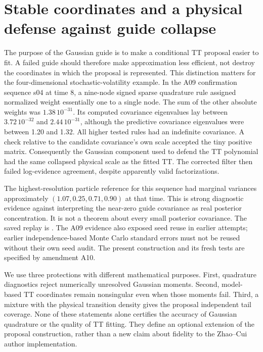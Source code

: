 \section{Stable coordinates and a physical defense against guide collapse}
\label{sec:robust-guide}

The purpose of the Gaussian guide is to make a conditional TT proposal easier
to fit. A failed guide should therefore make approximation less efficient,
not destroy the coordinates in which the proposal is represented. This
distinction matters for the four-dimensional stochastic-volatility example.
In the A09 confirmation sequence s04 at time 8, a nine-node signed sparse
quadrature rule assigned normalized weight essentially one to a single node.
The sum of the other absolute weights was $1.38\,10^{-31}$. Its computed
covariance eigenvalues lay between $3.72\,10^{-32}$ and $2.44\,10^{-31}$,
although the predictive covariance eigenvalues were between 1.20 and 1.32.
All higher tested rules had an indefinite covariance. A check relative to
the candidate covariance's own scale accepted the tiny positive matrix.
Consequently the Gaussian component used to defend the TT polynomial had
the same collapsed physical scale as the fitted TT. The corrected filter
then failed log-evidence agreement, despite apparently valid factorizations.

The highest-resolution particle reference for this sequence had marginal
variances approximately $(1.07,0.25,0.71,0.90)$ at that time. This is strong
diagnostic evidence against interpreting the near-zero guide covariance as
real posterior concentration. It is not a theorem about every small
posterior covariance. The saved replay is
.
The A09 evidence also exposed seed reuse in earlier attempts; earlier
independence-based Monte Carlo standard errors must not be reused without
their own seed audit. The present construction and its fresh tests are
specified by amendment A10.

We use three protections with different mathematical purposes. First,
quadrature diagnostics reject numerically unresolved Gaussian moments.
Second, model-based TT coordinates remain nonsingular even when those
moments fail. Third, a mixture with the physical transition density gives
the proposal independent tail coverage. None of these statements alone
certifies the accuracy of Gaussian quadrature or the quality of TT fitting.
They define an optional extension of the proposal construction, rather than
a new claim about fidelity to the Zhao--Cui author implementation.

